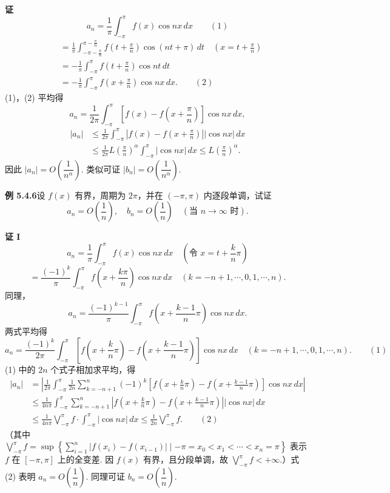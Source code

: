\documentclass[UTF8,12pt,a4paper,fontset=fandol]{ctexart}
\begin{document}
\noindent\textbf{证}\quad
\[
  a_n=\frac1\pi\int_{-\pi}^{\pi}f(x)\cos nx\,dx \qquad(1)
\]
\[
\begin{aligned}
&=\frac1\pi\int_{-\pi-\frac\pi n}^{\pi-\frac\pi n}
  f\left(t+\frac\pi n\right)\cos(nt+\pi)\,dt
  \quad\left(x=t+\frac\pi n\right)\\
&=-\frac1\pi\int_{-\pi}^{\pi}f\left(t+\frac\pi n\right)\cos nt\,dt\\
&=-\frac1\pi\int_{-\pi}^{\pi}f\left(x+\frac\pi n\right)\cos nx\,dx. \qquad(2)
\end{aligned}
\]
(1)，(2) 平均得
\[
  a_n=\frac1{2\pi}\int_{-\pi}^{\pi}
  \left[f(x)-f\left(x+\frac\pi n\right)\right]\cos nx\,dx,
\]
\[
\begin{aligned}
|a_n|
&\le\frac1{2\pi}\int_{-\pi}^{\pi}
\left|f(x)-f\left(x+\frac\pi n\right)\right||\cos nx|\,dx\\
&\le\frac1{2\pi}L\left(\frac\pi n\right)^{\alpha}
\int_{-\pi}^{\pi}|\cos nx|\,dx
\le L\left(\frac\pi n\right)^{\alpha}.
\end{aligned}
\]
因此 $|a_n|=O\left(\dfrac1{n^\alpha}\right)$. 类似可证 $|b_n|=O\left(\dfrac1{n^\alpha}\right)$.

\noindent\textbf{例 5.4.6}\quad 设 $f(x)$ 有界，周期为 $2\pi$，并在 $(-\pi,\pi)$ 内逐段单调，试证
\[
  a_n=O\left(\frac1n\right),\quad b_n=O\left(\frac1n\right)\quad(\text{当 }n\to\infty\text{ 时}).
\]

\noindent\textbf{证 I}\quad
\[
  a_n=\frac1\pi\int_{-\pi}^{\pi}f(x)\cos nx\,dx
  \quad\left(\text{令 }x=t+\frac kn\pi\right)
\]
\[
  =\frac{(-1)^k}{\pi}\int_{-\pi}^{\pi}f\left(x+\frac{k\pi}n\right)\cos nx\,dx
  \quad(k=-n+1,\cdots,0,1,\cdots,n).
\]
同理，
\[
  a_n=\frac{(-1)^{k-1}}{\pi}\int_{-\pi}^{\pi}
  f\left(x+\frac{k-1}{n}\pi\right)\cos nx\,dx.
\]
两式平均得
\[
  a_n=\frac{(-1)^k}{2\pi}\int_{-\pi}^{\pi}
  \left[f\left(x+\frac kn\pi\right)-f\left(x+\frac{k-1}{n}\pi\right)\right]\cos nx\,dx
  \quad(k=-n+1,\cdots,0,1,\cdots,n). \qquad(1)
\]
(1) 中的 $2n$ 个式子相加求平均，得
\[
\begin{aligned}
|a_n|
&=\left|\frac1{2\pi}\int_{-\pi}^{\pi}\frac1{2n}
\sum_{k=-n+1}^{n}(-1)^k
\left[f\left(x+\frac kn\pi\right)-f\left(x+\frac{k-1}{n}\pi\right)\right]\cos nx\,dx\right|\\
&\le\frac1{4n\pi}\int_{-\pi}^{\pi}
\sum_{k=-n+1}^{n}\left|
f\left(x+\frac kn\pi\right)-f\left(x+\frac{k-1}{n}\pi\right)
\right||\cos nx|\,dx\\
&\le\frac1{4n\pi}\bigvee_{-\pi}^{\pi}f\cdot
\int_{-\pi}^{\pi}|\cos nx|\,dx
\le\frac1{2n}\bigvee_{-\pi}^{\pi}f. \qquad(2)
\end{aligned}
\]
（其中 $\displaystyle\bigvee_{-\pi}^{\pi}f=\sup\left\{\sum_{i=1}^{n}|f(x_i)-f(x_{i-1})|\mid -\pi=x_0<x_1<\cdots<x_n=\pi\right\}$ 表示 $f$ 在 $[-\pi,\pi]$ 上的全变差. 因 $f(x)$ 有界，且分段单调，故 $\displaystyle\bigvee_{-\pi}^{\pi}f<+\infty$.）式 (2) 表明 $a_n=O\left(\dfrac1n\right)$. 同理可证 $b_n=O\left(\dfrac1n\right)$.
\end{document}
